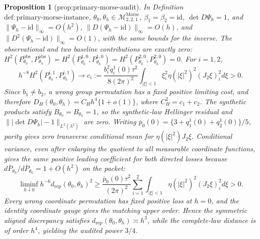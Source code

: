 \documentclass{article}
\newtheorem{proposition}{Proposition}
\begin{document}
\begin{proposition}[prop:primary-morse-audit]\label{prop:primary-morse-audit}
In Definition \(\mathrm{def:primary\text{-}morse\text{-}instance}\), \(\theta_0,\theta_h\in\mathcal M^{\mathrm{Morse}}_{2,2,1}\), \(\beta_1=\beta_2=\mathrm{id}\), \(\det D\Psi_h=1\), and \(\lVert\Psi_h-\mathrm{id}\rVert_\infty=O(h^2)\), \(\lVert D(\Psi_h-\mathrm{id})\rVert_\infty=O(h)\), and \(\lVert D^2(\Psi_h-\mathrm{id})\rVert_\infty=O(1)\), with the same bounds for the inverse. The observational and two baseline contributions are exactly zero: \(H^2(P_{\theta_0}^{\mathrm{obs}},P_{\theta_h}^{\mathrm{obs}})=H^2(P_{\theta_0}^{1,0},P_{\theta_h}^{1,0})=H^2(P_{\theta_0}^{2,0},P_{\theta_h}^{2,0})=0\). For \(i=1,2\),
\[
h^{-8}H^2(P_{\theta_0}^{i,1},P_{\theta_h}^{i,1})\longrightarrow c_i:=\frac{b_i^2q_i^1(0)\tau^2}{8(2\pi)^2}\int_{|\xi|<1}\xi_i^2\eta(|\xi|^2)^2(J_2\xi)_i^2d\xi>0.
\]
Since \(b_1\ne b_2\), a wrong group permutation has a fixed positive limiting cost, and therefore \(D_H(\theta_0,\theta_h)=C_Hh^4\{1+o(1)\}\), where \(C_H^2=c_1+c_2\). The synthetic products satisfy \(B_{\theta_0}=B_{\theta_h}=1\), so the synthetic-law Hellinger residual and \(\lVert|\det D\Psi_h|-1\rVert_{L^2(\lambda^2)}\) are zero. Writing \(\overline p_0(0)=\{3+q_1^1(0)+q_2^1(0)\}/5\), parity gives zero transverse conditional mean for \(\eta(|\xi|^2)J_2\xi\). Conditional variance, even after enlarging the quotient to all measurable coordinate functions, gives the same positive leading coefficient for both directed losses because \(d\bar P_{\theta_h}/d\bar P_{\theta_0}=1+O(h^2)\) on the packet:
\[
\liminf_{h\downarrow0}h^{-6}d_{\mathrm{rep}}(\theta_0,\theta_h)^2\ge\frac{\overline p_0(0)\tau^2}{(2\pi)^2}\sum_{i=1}^2\int_{|\xi|<1}\eta(|\xi|^2)^2(J_2\xi)_i^2d\xi>0.
\]
Every wrong coordinate permutation has fixed positive loss at \(h=0\), and the identity coordinate gauge gives the matching upper order. Hence the symmetric aligned discrepancy satisfies \(d_{\mathrm{rep}}(\theta_0,\theta_h)\asymp h^3\), while the complete-law distance is of order \(h^4\), yielding the audited power \(3/4\).
\end{proposition}
\end{document}
